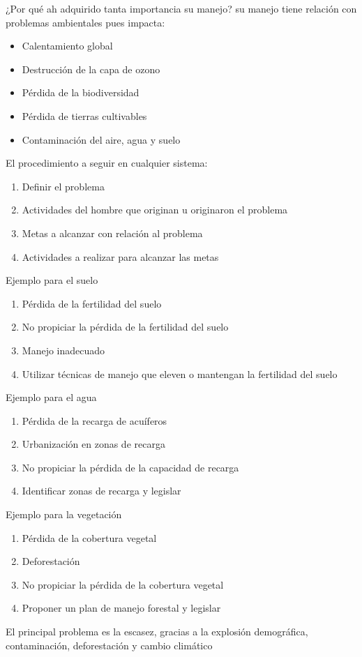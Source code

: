 ¿Por qué ah adquirido tanta importancia su manejo? su manejo tiene relación con problemas ambientales pues impacta:
\begin{itemize}
    \item Calentamiento global
    \item Destrucción de la capa de ozono
    \item Pérdida de la biodiversidad
    \item Pérdida de tierras cultivables
    \item Contaminación del aire, agua y suelo
\end{itemize}

El procedimiento a seguir en cualquier sistema:
\begin{enumerate}
    \item Definir el problema
    \item Actividades del hombre que originan u originaron el problema
    \item Metas a alcanzar con relación al problema
    \item Actividades a realizar para alcanzar las metas
\end{enumerate}

Ejemplo para el suelo
\begin{enumerate}
    \item Pérdida de la fertilidad del suelo
    \item No propiciar la pérdida de la fertilidad del suelo
    \item Manejo inadecuado
    \item Utilizar técnicas de manejo que eleven o mantengan la fertilidad del suelo
\end{enumerate}
Ejemplo para el agua
\begin{enumerate}
    \item Pérdida de la recarga de acuíferos
    \item Urbanización en zonas de recarga
    \item No propiciar la pérdida de la capacidad de recarga
    \item Identificar zonas de recarga y legislar
\end{enumerate}
Ejemplo para la vegetación
\begin{enumerate}
    \item Pérdida de la cobertura vegetal
    \item Deforestación
    \item No propiciar la pérdida de la cobertura vegetal
    \item Proponer un plan de manejo forestal y legislar
\end{enumerate}
El principal problema es la escasez, gracias a la explosión demográfica, contaminación, deforestación y cambio climático

